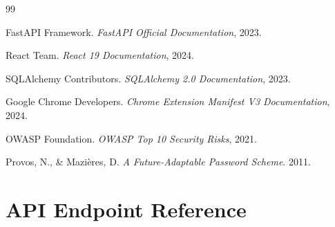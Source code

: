 \documentclass[12pt,a4paper]{article}
\begin{document}
\begin{thebibliography}{99}

 FastAPI Framework. \textit{FastAPI Official Documentation}, 2023.

 React Team. \textit{React 19 Documentation}, 2024.

 SQLAlchemy Contributors. \textit{SQLAlchemy 2.0 Documentation}, 2023.

 Google Chrome Developers. \textit{Chrome Extension Manifest V3 Documentation}, 2024.

 OWASP Foundation. \textit{OWASP Top 10 Security Risks}, 2021.

 Provos, N., \& Mazières, D. \textit{A Future-Adaptable Password Scheme}. 2011.

\end{thebibliography}

\newpage

\appendix

\section{API Endpoint Reference}
\end{document}
